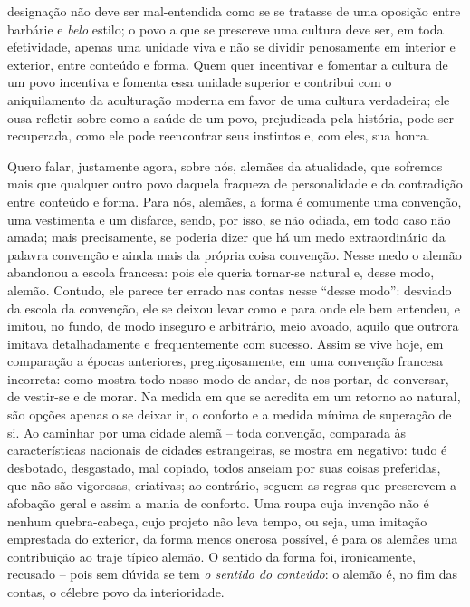     designação não deve ser mal-entendida como se se tratasse de uma
    oposição entre barbárie e \emph{belo} estilo; o povo a que se
    prescreve uma cultura deve ser, em toda efetividade, apenas uma
    unidade viva e não se dividir penosamente em interior e exterior,
    entre conteúdo e forma. Quem quer incentivar e fomentar a cultura de
    um povo incentiva e fomenta essa unidade superior e contribui com o
    aniquilamento da aculturação moderna em favor de uma cultura
    verdadeira; ele ousa refletir sobre como a saúde de um povo,
    prejudicada pela história, pode ser recuperada, como ele pode
    reencontrar seus instintos e, com eles, sua honra.

    Quero falar, justamente agora, sobre nós, alemães da atualidade, que
    sofremos mais que qualquer outro povo daquela fraqueza de
    personalidade e da contradição entre conteúdo e forma. Para nós,
    alemães, a forma é comumente uma convenção, uma vestimenta e um
    disfarce, sendo, por isso, se não odiada, em todo caso não amada;
    mais precisamente, se poderia dizer que há um medo extraordinário da
    palavra convenção e ainda mais da própria coisa convenção. Nesse
    medo o alemão abandonou a escola francesa: pois ele queria tornar-se
    natural e, desse modo, alemão. Contudo, ele parece ter errado nas
    contas nesse ``desse modo'': desviado da escola da convenção, ele se
    deixou levar como e para onde ele bem entendeu, e imitou, no fundo,
    de modo inseguro e arbitrário, meio avoado, aquilo que outrora
    imitava detalhadamente e frequentemente com sucesso. Assim se vive
    hoje, em comparação a épocas anteriores, preguiçosamente, em uma
    convenção francesa incorreta: como mostra todo nosso modo de andar,
    de nos portar, de conversar, de vestir-se e de morar. Na medida em
    que se acredita em um retorno ao natural, são opções apenas o se
    deixar ir, o conforto e a medida mínima de superação de si. Ao
    caminhar por uma cidade alemã -- toda convenção, comparada às
    características nacionais de cidades estrangeiras, se mostra em
    negativo: tudo é desbotado, desgastado, mal copiado, todos anseiam
    por suas coisas preferidas, que não são vigorosas, criativas; ao
    contrário, seguem as regras que prescrevem a afobação geral e assim
    a mania de conforto. Uma roupa cuja invenção não é nenhum
    quebra-cabeça, cujo projeto não leva tempo, ou seja, uma imitação
    emprestada do exterior, da forma menos onerosa possível, é para os
    alemães uma contribuição ao traje típico alemão. O sentido da forma
    foi, ironicamente, recusado -- pois sem dúvida se tem \emph{o
    sentido do conteúdo}: o alemão é, no fim das contas, o célebre povo
    da interioridade.

